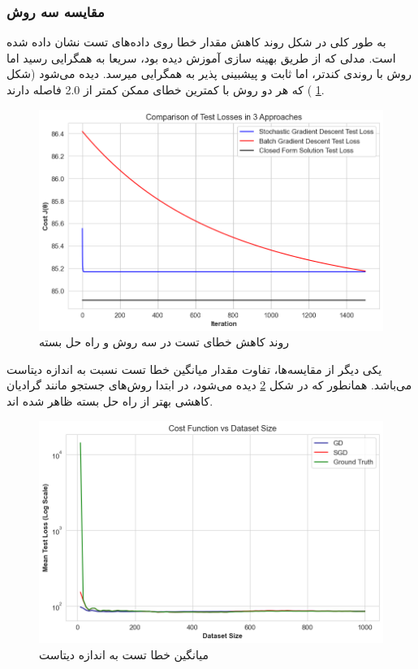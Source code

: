 \documentclass{article}
\begin{document}
	\subsubsection{مقایسه سه روش}
	به طور کلی در شکل
	روند کاهش مقدار خطا روی داده‌های تست نشان داده شده است. مدلی که از طریق بهینه سازی
	آموزش دیده بود، سریعا به همگرایی رسید اما روش 
	با روندی کندتر، اما ثابت و پیشبینی پذیر به همگرایی میرسد. دیده می‌شود (شکل
	\ref{fig: loss_comparison}
	) که هر دو روش با کمترین خطای ممکن کمتر از 2.0 فاصله دارند.
	\begin{figure}[H]
		\centering
		\includegraphics[scale=0.5]{figs/loss_comparison}
		\caption{روند کاهش خطای تست در سه روش 
		و راه حل بسته
		}
		\label{fig: loss_comparison}
	\end{figure}
	یکی دیگر از مقایسه‌ها، تفاوت مقدار میانگین خطا تست نسبت به اندازه دیتاست می‌باشد. همانطور که در شکل
	 \ref{fig: dataset_comparison}
	دیده می‌شود، در ابتدا روش‌های جستجو مانند گرادیان کاهشی بهتر از راه حل بسته ظاهر شده اند.
	\begin{figure}[H]
		\centering
		\includegraphics[scale=0.5]{figs/dataset_size_compar}
		\caption{میانگین خطا تست به اندازه دیتاست}
		\label{fig: dataset_comparison}
	\end{figure}
\end{document}
